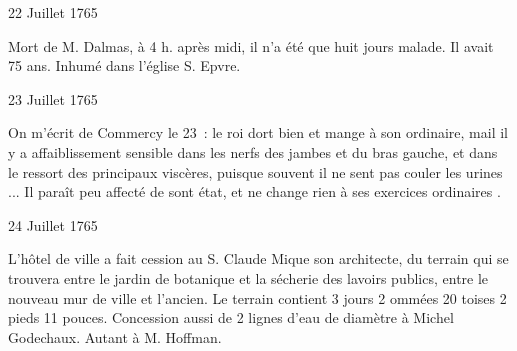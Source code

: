                      \begin{diary}{22 Juillet 1765}{}
                        
                         Mort de M. Dalmas, à 4 h. après midi,
                           il n'a été que huit jours malade.
                           Il avait 75 ans. Inhumé dans l’église S. Epvre. \bigskip
        
        
                     \end{diary}

                     \begin{diary}{23 Juillet 1765}{}
                        
                         On m'écrit de Commercy
                           le 23 : \og le roi
                              dort bien et mange à son ordinaire, mail il
                              y a affaiblissement sensible dans les nerfs des
                              jambes et du bras gauche, et dans le ressort des
                              principaux viscères, puisque souvent il ne
                              sent pas couler les urines ... Il paraît peu
                              affecté de sont état, et ne change rien à
                              ses exercices ordinaires \fg{}. \bigskip
        
        
                     \end{diary}

                     \begin{diary}{24 Juillet 1765}{}
                        
                        
                           L'hôtel de ville a fait cession au
                              S. Claude
                              Mique son architecte, du terrain qui
                           se trouvera entre le jardin de
                              botanique
                           et la sécherie des lavoirs
                              publics, entre le
                           nouveau mur de ville et l'ancien. Le terrain
                           contient 3 jours 2 ommées 20 toises 2 pieds 11 pouces.
                           Concession aussi de 2 lignes d'eau de diamètre
                           à Michel Godechaux. Autant à
                              M. Hoffman. \bigskip
        
        
                     \end{diary}

